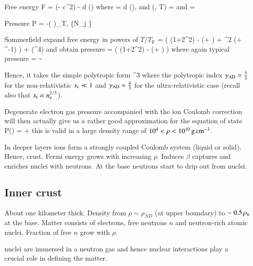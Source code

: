 Free energy
\be
F = (\mu  - \me c^2) \nel -  \int d   \cdot {} \fFD(\epsilon)
\ee
where 
\be
\nel =  \int d \fFD(\epsilon),
\ee
and
\be
\fFD(\epsilon, T) = 
\ee
and
\be
\epsilon = 
\ee

Pressure 
\be
P = -\left(  \right)_{T, \{N_j \} }
\ee

Sommerfield expand free energy in powers of $T/T_{\mathrm{F}}$ 
\be
{} =    \left( \xr(1+2\xr^2) \gammar - \ln(\xr + \gammar) +  \tr^2 \xr(\gammar + \gammar^{-1})  \right)  + (\tr^4)
\ee
and obtain pressure 
\be
\Peid =  \left( \xr(1+2\xr^2) \gammar - \ln(\xr + \gammar) \right)
\ee
where again typical pressure
\be
\Pressr =  \sim {} \dyncm
\ee

Hence, it takes the simple polytropic form
\be
\Peid \approx \frac{ \Pressr }{9\pi^2 \gammaad} \xr^{3\gammaad}
\ee
where the polytropic index $\gamma_{\mathrm{AD}} = \frac{5}{3}$ for the non-relativistic $x_{\mathrm{r}} \ll 1$ and $\gamma_{\mathrm{AD}} = \frac{4}{3}$ for the ultra-relativistic case (recall also that $x_{\mathrm{r}} \propto n_{\mathrm{e}}^{1/3}$).


Degenerate electron gas pressure accompanied with the ion Coulomb correction will then actually give us a rather good approximation for the equation of state
\be
P(\xr) = \Peid + \Pii
\ee
this is valid in a large density range of $10^{4} < \rho < 10^{10} \, \mathrm{g}\,\mathrm{cm}^{-3}$.

In deeper layers ions form a strongly coupled Coulomb system (liquid or solid).
Hence, crust.
Fermi energy grows with increasing $\rho$.
Induces $\beta$ captures and enriches nuclei with neutrons.
At the base neutrons start to drip out from nuclei.


\subsection{Inner crust}
About one kilometer thick.
Density from $\rho \sim \rho_{ND}$ (at upper boundary) to $\sim 0.5 \, \rho_{\mathrm{n}} $ at the base.
Matter consists of electrons, free neutrons $n$ and neutron-rich atomic nuclei.
Fraction of free $n$ grow with $\rho$.

nuclei are immersed in a neutron gas and hence nuclear interactions play a crucial role in defining the matter.

